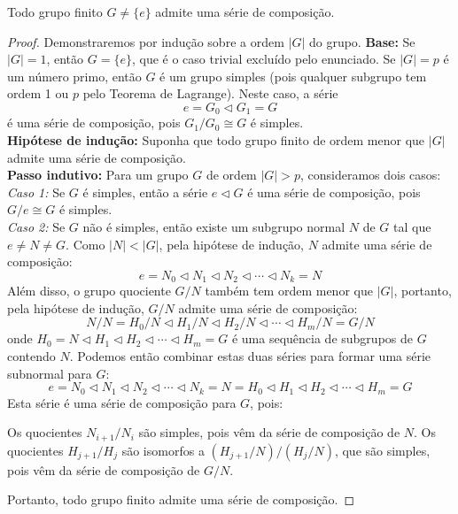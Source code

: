 \documentclass[11pt,openany]{book}
\begin{document}
\begin{proposition}
\label{prop:grupo_finito_admite_serie_decomposicao}
    Todo grupo finito $G \not= \{e\}$ admite uma série de composição.
\end{proposition}
\begin{proof}
        Demonstraremos por indução sobre a ordem $|G|$ do grupo.
        \textbf{Base:} Se $|G| = 1$, então $G = \{e\}$, que é o caso trivial excluído pelo enunciado.
        Se $|G| = p$ é um número primo, então $G$ é um grupo simples (pois qualquer subgrupo tem ordem 1 ou $p$ pelo Teorema de Lagrange). Neste caso, a série
        $$
        {e} = G_0 \triangleleft G_1 = G
        $$
        é uma série de composição, pois $G_1/G_0 \cong G$ é simples.\\
        \textbf{Hipótese de indução:} Suponha que todo grupo finito de ordem menor que $|G|$ admite uma série de composição.\\
        \textbf{Passo indutivo:} Para um grupo $G$ de ordem $|G| > p$, consideramos dois casos:\\
        \textit{Caso 1:} Se $G$ é simples, então a série ${e} \triangleleft G$ é uma série de composição, pois $G/{e} \cong G$ é simples.\\
        \textit{Caso 2:} Se $G$ não é simples, então existe um subgrupo normal $N$ de $G$ tal que ${e} \neq N \neq G$. Como $|N| < |G|$, pela hipótese de indução, $N$ admite uma série de composição:\\
        $$
        {e} = N_0 \triangleleft N_1 \triangleleft N_2 \triangleleft \cdots \triangleleft N_k = N
        $$
        Além disso, o grupo quociente $G/N$ também tem ordem menor que $|G|$, portanto, pela hipótese de indução, $G/N$ admite uma série de composição:
        $$
        {N}/N = H_0/N \triangleleft H_1/N \triangleleft H_2/N \triangleleft \cdots \triangleleft H_m/N = G/N
        $$
        onde $H_0 = N \triangleleft H_1 \triangleleft H_2 \triangleleft \cdots \triangleleft H_m = G$ é uma sequência de subgrupos de $G$ contendo $N$.
        Podemos então combinar estas duas séries para formar uma série subnormal para $G$:
        $$
        {e} = N_0 \triangleleft N_1 \triangleleft N_2 \triangleleft \cdots \triangleleft N_k = N = H_0 \triangleleft H_1 \triangleleft H_2 \triangleleft \cdots \triangleleft H_m = G
        $$
        Esta série é uma série de composição para $G$, pois:

        Os quocientes $N_{i+1}/N_i$ são simples, pois vêm da série de composição de $N$.
        Os quocientes $H_{j+1}/H_j$ são isomorfos a $(H_{j+1}/N)/(H_j/N)$, que são simples, pois vêm da série de composição de $G/N$.

        Portanto, todo grupo finito admite uma série de composição.
\end{proof}
\end{document}
